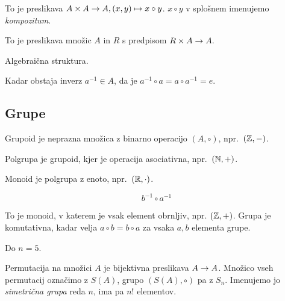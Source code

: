 To je preslikava $A \times A \to A, (x, y) \mapsto x \circ y$. $x\circ y$ v splošnem imenujemo \textit{kompozitum}.


To je preslikava množic $A$ in $R$ s predpisom $R\times A \to A.$


Algebraična struktura.


Kadar obstaja inverz $a^{-1} \in A$, da je $a^{-1} \circ a = a \circ a^{-1} = e$.

\subsection{Grupe}


Grupoid je neprazna množica z binarno operacijo $(A, \circ)$, npr.~$(\mathbb{Z}, -)$.

Polgrupa je grupoid, kjer je operacija asociativna, npr.~$(\mathbb{N}, +)$.

Monoid je polgrupa z enoto, npr.~$(\mathbb{R}, \cdot)$.


\[
	b^{-1} \circ a^{-1}
\]


To je monoid, v katerem je vsak element obrnljiv, npr. $(\mathbb{Z}, +)$. Grupa je komutativna, kadar velja $a \circ b = b \circ a$ za vsaka $a, b$ elementa grupe.


Do $n=5$.


Permutacija na množici $A$ je bijektivna preslikava $A \to A$. Množico vseh permutacij označimo z $S(A)$, grupo $(S(A), \circ)$ pa z $S_n$. Imenujemo jo \textit{simetrična grupa} reda $n$, ima pa $n!$ elementov.



